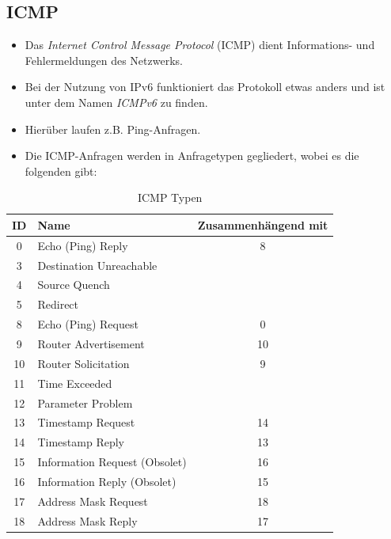\documentclass[a4paper, 11pt, accentcolor = tud3b]{tudreport}
\begin{document}
            \subsection{ICMP}
                \begin{itemize}
                	\item Das \textit{Internet Control Message Protocol} (ICMP) dient Informations- und Fehlermeldungen des Netzwerks.
                	\item Bei der Nutzung von IPv6 funktioniert das Protokoll etwas anders und ist unter dem Namen \textit{ICMPv6} zu finden.
                	\item Hierüber laufen z.B. Ping-Anfragen.
                	\item Die ICMP-Anfragen werden in Anfragetypen gegliedert, wobei es die folgenden gibt:
                \end{itemize}
				\begin{table}[H]
					\centering
					\begin{tabular}{c | l | c}
						\textbf{ID} & \textbf{Name}                 & \textbf{Zusammenhängend mit} \\ \hline
						     0      & Echo (Ping) Reply             & 8                            \\
						     3      & Destination Unreachable       &  \\
						     4      & Source Quench                 &  \\
						     5      & Redirect                      &  \\
						     8      & Echo (Ping) Request           & 0                            \\
						     9      & Router Advertisement          & 10                           \\
						    10      & Router Solicitation           & 9                            \\
						    11      & Time Exceeded                 &  \\
						    12      & Parameter Problem             &  \\
						    13      & Timestamp Request             & 14                           \\
						    14      & Timestamp Reply               & 13                           \\
						    15      & Information Request (Obsolet) & 16                           \\
						    16      & Information Reply (Obsolet)   & 15                           \\
						    17      & Address Mask Request          & 18                           \\
						    18      & Address Mask Reply            & 17
					\end{tabular}
					\caption{ICMP Typen}
				\end{table}
\end{document}
